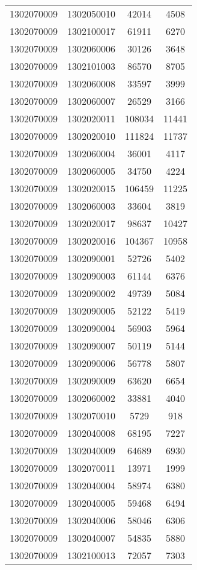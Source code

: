 \begin{longtable}[h]{llcc}
		1302070009 & 1302050010 & 42014 & 4508\\
		1302070009 & 1302100017 & 61911 & 6270\\
		1302070009 & 1302060006 & 30126 & 3648\\
		1302070009 & 1302101003 & 86570 & 8705\\
		1302070009 & 1302060008 & 33597 & 3999\\
		1302070009 & 1302060007 & 26529 & 3166\\
		1302070009 & 1302020011 & 108034 & 11441\\
		1302070009 & 1302020010 & 111824 & 11737\\
		1302070009 & 1302060004 & 36001 & 4117\\
		1302070009 & 1302060005 & 34750 & 4224\\
		1302070009 & 1302020015 & 106459 & 11225\\
		1302070009 & 1302060003 & 33604 & 3819\\
		1302070009 & 1302020017 & 98637 & 10427\\
		1302070009 & 1302020016 & 104367 & 10958\\
		1302070009 & 1302090001 & 52726 & 5402\\
		1302070009 & 1302090003 & 61144 & 6376\\
		1302070009 & 1302090002 & 49739 & 5084\\
		1302070009 & 1302090005 & 52122 & 5419\\
		1302070009 & 1302090004 & 56903 & 5964\\
		1302070009 & 1302090007 & 50119 & 5144\\
		1302070009 & 1302090006 & 56778 & 5807\\
		1302070009 & 1302090009 & 63620 & 6654\\
		1302070009 & 1302060002 & 33881 & 4040\\
		1302070009 & 1302070010 & 5729 & 918\\
		1302070009 & 1302040008 & 68195 & 7227\\
		1302070009 & 1302040009 & 64689 & 6930\\
		1302070009 & 1302070011 & 13971 & 1999\\
		1302070009 & 1302040004 & 58974 & 6380\\
		1302070009 & 1302040005 & 59468 & 6494\\
		1302070009 & 1302040006 & 58046 & 6306\\
		1302070009 & 1302040007 & 54835 & 5880\\
		1302070009 & 1302100013 & 72057 & 7303\\

\end{longtable}
